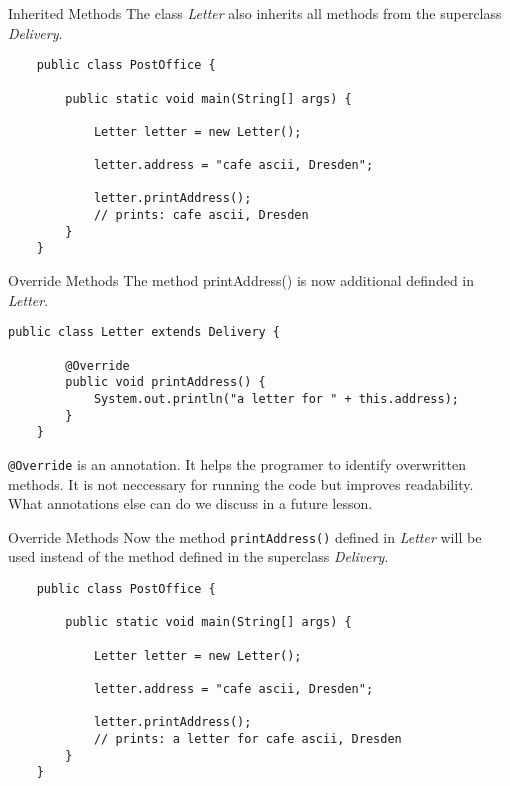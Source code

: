 \begin{frame}[fragile]{Inherited Methods}
	The class \emph{Letter} also inherits all methods from the superclass \emph{Delivery}.
	\begin{lstlisting}
	public class PostOffice {
	
	    public static void main(String[] args) {
	    
	        Letter letter = new Letter();
	        
	        letter.address = "cafe ascii, Dresden";
	        
	        letter.printAddress();
	        // prints: cafe ascii, Dresden
	    }	
	}
	\end{lstlisting}
\end{frame}

\begin{frame}[fragile]{Override Methods}
	The method printAddress() is now additional definded in \emph{Letter}.
	\begin{lstlisting}[escapechar=!]
	public class Letter extends Delivery {
	
	    @Override
	    public void printAddress() {
	        System.out.println("a letter for " + this.address);    
	    }	
	}
	\end{lstlisting}
	\texttt{@Override} is an annotation. 
	It helps the programer to identify overwritten methods.
	It is not neccessary for running the code but improves readability.
	What annotations else can do we discuss in a future lesson.
\end{frame}
\begin{frame}[fragile]{Override Methods}
	Now the method \texttt{printAddress()} defined in \emph{Letter} will be used instead of the method defined
	in the superclass \emph{Delivery}.
	\begin{lstlisting}
	public class PostOffice {
	
	    public static void main(String[] args) {
	    
	        Letter letter = new Letter();
	        
	        letter.address = "cafe ascii, Dresden";
	        
	        letter.printAddress();
	        // prints: a letter for cafe ascii, Dresden
	    }	
	}
	\end{lstlisting}
\end{frame}

